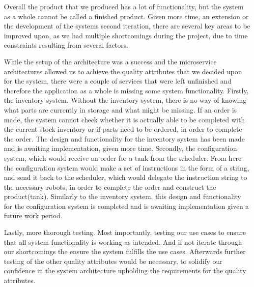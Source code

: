 
Overall the product that we produced has a lot of functionality, but the system as a whole cannot be called a finished product. Given more time, an extension or the development of the systems second iteration, there are several key areas to be improved upon, as we had multiple shortcomings during the project, due to time constraints resulting from several factors.

While the setup of the architecture was a success and the microservice architectures allowed us to achieve the quality attributes that we decided upon for the system, there were a couple of services that were left unfinished and therefore the application as a whole is missing some system functionality.
Firstly, the inventory system. Without the inventory system, there is no way of knowing what parts are currently in storage and what might be missing. If an order is made, the system cannot check whether it is actually able to be completed with the current stock inventory or if parts need to be ordered, in order to complete the order. The design and functionality for the inventory system has been made and is awaiting implementation, given more time.
Secondly, the configuration system, which would receive an order for a tank from the scheduler. From here the configuration system would make a set of instructions in the form of a string, and send it back to the scheduler, which would delegate the instruction string to the necessary robots, in order to complete the order and construct the product(tank). Similarly to the inventory system, this design and functionality for the configuration system is completed and is awaiting implementation given a future work period.

Lastly, more thorough testing. Most importantly, testing our use cases to ensure that all system functionality is working as intended. And if not iterate through our shortcomings the ensure the system fulfills the use cases. Afterwards further testing of the other quality attributes would be necessary, to solidify our confidence in the system architecture upholding the requirements for the quality attributes.